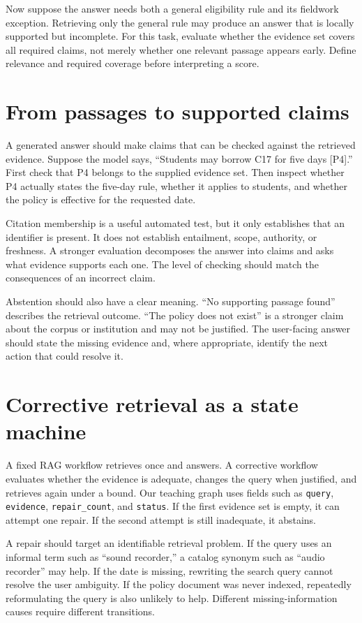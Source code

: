 Now suppose the answer needs both a general eligibility rule and its fieldwork exception. Retrieving only the general rule may produce an answer that is locally supported but incomplete. For this task, evaluate whether the evidence set covers all required claims, not merely whether one relevant passage appears early. Define relevance and required coverage before interpreting a score.

\section{From passages to supported claims}
A generated answer should make claims that can be checked against the retrieved evidence. Suppose the model says, “Students may borrow C17 for five days [P4].” First check that P4 belongs to the supplied evidence set. Then inspect whether P4 actually states the five-day rule, whether it applies to students, and whether the policy is effective for the requested date.

Citation membership is a useful automated test, but it only establishes that an identifier is present. It does not establish entailment, scope, authority, or freshness. A stronger evaluation decomposes the answer into claims and asks what evidence supports each one. The level of checking should match the consequences of an incorrect claim.

Abstention should also have a clear meaning. “No supporting passage found” describes the retrieval outcome. “The policy does not exist” is a stronger claim about the corpus or institution and may not be justified. The user-facing answer should state the missing evidence and, where appropriate, identify the next action that could resolve it.

\section{Corrective retrieval as a state machine}
A fixed RAG workflow retrieves once and answers. A corrective workflow evaluates whether the evidence is adequate, changes the query when justified, and retrieves again under a bound. Our teaching graph uses fields such as \texttt{query}, \texttt{evidence}, \texttt{repair\_count}, and \texttt{status}. If the first evidence set is empty, it can attempt one repair. If the second attempt is still inadequate, it abstains.

A repair should target an identifiable retrieval problem. If the query uses an informal term such as “sound recorder,” a catalog synonym such as “audio recorder” may help. If the date is missing, rewriting the search query cannot resolve the user ambiguity. If the policy document was never indexed, repeatedly reformulating the query is also unlikely to help. Different missing-information causes require different transitions.

